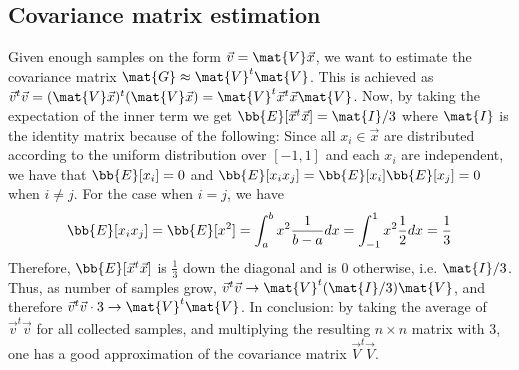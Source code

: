 \subsection{Covariance matrix estimation}
Given enough samples on the form $\vec{v} = \mat{V} \vec{x}$, we want to estimate the covariance matrix $\mat{G} \approx \mat{V}^t \mat{V}$.
This is achieved as $\vec{v}^t \vec{v} = (\mat{V} \vec{x})^t(\mat{V} \vec{x}) = \mat{V}^t \vec{x}^t \vec{x} \mat{V}$.
Now, by taking the expectation of the inner term we get $\bb{E}[\vec{x}^t \vec{x}] = \mat{I} / 3$ where $\mat{I}$ is the identity matrix because of the following:
Since all $x_i \in \vec{x}$ are distributed according to the uniform distribution over $[-1, 1]$ and each $x_i$ are independent, 
we have that $\bb{E}[x_i] = 0$ and $\bb{E}[x_i x_j] = \bb{E}[x_i] \bb{E}[x_j] = 0$ when $i \neq j$.
For the case when $i = j$, we have \[\bb{E}[x_i x_j] = \bb{E}[x ^2] = \int_{a}^{b} x^2 \frac{1}{b-a} dx = \int_{-1}^{1} x^2 \frac{1}{2} dx = \frac{1}{3}\]
Therefore, $\bb{E}[\vec{x}^t \vec{x}]$ is $\frac{1}{3}$ down the diagonal and is 0 otherwise, i.e. $\mat{I} / 3$.
Thus, as number of samples grow, $\vec{v} ^t \vec{v} \rightarrow \mat{V}^t (\mat{I} / 3) \mat{V}$, and therefore $\vec{v}^t \vec{v} \cdot 3 \rightarrow \mat{V}^t \mat{V}$.
In conclusion: by taking the average of $\vec{v}^t \vec{v}$ for all collected samples, and multiplying the resulting $n \times n$ matrix with $3$, one 
has a good approximation of the covariance matrix $\vec{V}^t \vec{V}$.
